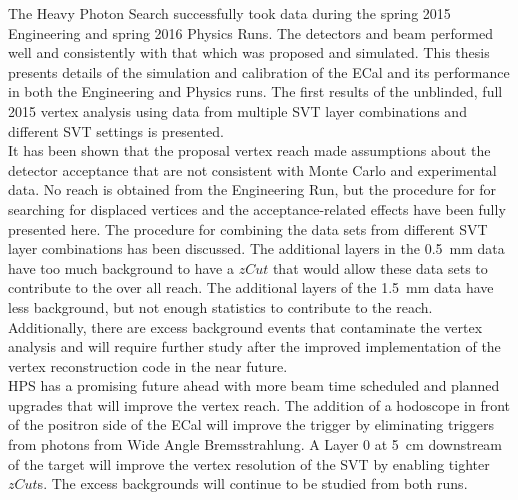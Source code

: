 The Heavy Photon Search successfully took data during the spring 2015 Engineering and spring 2016 Physics Runs. The detectors and beam performed well and consistently with that which was proposed and simulated. This thesis presents details of the simulation and calibration of the ECal and its performance in both the Engineering and Physics runs. The first results of the unblinded, full 2015 vertex analysis using data from multiple SVT layer combinations and different SVT settings is presented. \\
\indent It has been shown that the proposal vertex reach made assumptions about the detector acceptance that are not consistent with Monte Carlo and experimental data. No reach is obtained from the Engineering Run, but the procedure for for searching for displaced vertices and the acceptance-related effects have been fully presented here. The procedure for combining the data sets from different SVT layer combinations has been discussed. The additional layers in the 0.5~mm data have too much background to have a $zCut$ that would allow these data sets to contribute to the over all reach. The additional layers of the 1.5~mm data have less background, but not enough statistics to contribute to the reach. Additionally, there are excess background events that contaminate the vertex analysis and will require further study after the improved implementation of the vertex reconstruction code in the near future. \\
\indent HPS has a promising future ahead with more beam time scheduled and planned upgrades that will improve the vertex reach. The addition of a hodoscope in front of the positron side of the ECal will improve the trigger by eliminating triggers from photons from Wide Angle Bremsstrahlung. A Layer 0 at 5~cm downstream of the target will improve the vertex resolution of the SVT by enabling tighter $zCut$s. The excess backgrounds will continue to be studied from both runs. 
